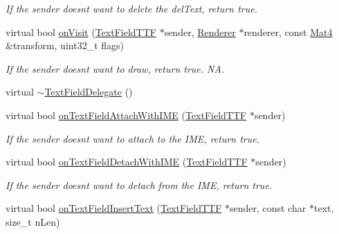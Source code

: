 \begin{DoxyCompactItemize}
\begin{DoxyCompactList}\small\item\em If the sender doesn\textquotesingle{}t want to delete the del\+Text, return true. \end{DoxyCompactList}\item 
\mbox{\label{classTextFieldDelegate_a3d241e2f760b6ec400c89112c62a4def}} 
virtual bool \hyperlink{classTextFieldDelegate_a3d241e2f760b6ec400c89112c62a4def}{on\+Visit} (\hyperlink{classTextFieldTTF}{Text\+Field\+T\+TF} $\ast$sender, \hyperlink{classRenderer}{Renderer} $\ast$renderer, const \hyperlink{classMat4}{Mat4} \&transform, uint32\+\_\+t flags)
\begin{DoxyCompactList}\small\item\em If the sender doesn\textquotesingle{}t want to draw, return true.  NA. \end{DoxyCompactList}\item 
virtual \hyperlink{classTextFieldDelegate_a006be6969fc9f895b3a7b0bbc2054a99}{$\sim$\+Text\+Field\+Delegate} ()
\item 
\mbox{\label{classTextFieldDelegate_a4eb62149d7c1ddabc6f40336d44c6cd9}} 
virtual bool \hyperlink{classTextFieldDelegate_a4eb62149d7c1ddabc6f40336d44c6cd9}{on\+Text\+Field\+Attach\+With\+I\+ME} (\hyperlink{classTextFieldTTF}{Text\+Field\+T\+TF} $\ast$sender)
\begin{DoxyCompactList}\small\item\em If the sender doesn\textquotesingle{}t want to attach to the I\+ME, return true. \end{DoxyCompactList}\item 
\mbox{\label{classTextFieldDelegate_ae3e2aa4e295af9b25c737b40936f2d35}} 
virtual bool \hyperlink{classTextFieldDelegate_ae3e2aa4e295af9b25c737b40936f2d35}{on\+Text\+Field\+Detach\+With\+I\+ME} (\hyperlink{classTextFieldTTF}{Text\+Field\+T\+TF} $\ast$sender)
\begin{DoxyCompactList}\small\item\em If the sender doesn\textquotesingle{}t want to detach from the I\+ME, return true. \end{DoxyCompactList}\item 
\mbox{\label{classTextFieldDelegate_a8bbb7ff5e2ad77a7973753c44be6a000}} 
virtual bool \hyperlink{classTextFieldDelegate_a8bbb7ff5e2ad77a7973753c44be6a000}{on\+Text\+Field\+Insert\+Text} (\hyperlink{classTextFieldTTF}{Text\+Field\+T\+TF} $\ast$sender, const char $\ast$text, size\+\_\+t n\+Len)

\end{DoxyCompactItemize}
